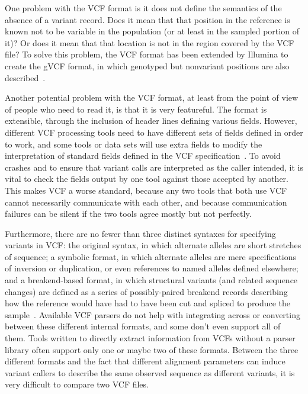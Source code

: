 One problem with the VCF format is it does not define the semantics of the absence of a variant record. Does it mean that that position in the reference is known not to be variable in the population (or at least in the sampled portion of it)? Or does it mean that that location is not in the region covered by the VCF file? To solve this problem, the VCF format has been extended by Illumina to create the gVCF format, in which genotyped but nonvariant positions are also described~\cite{saunders2014about}.

Another potential problem with the VCF format, at least from the point of view of people who need to read it, is that it is very featureful. The format is extensible, through the inclusion of header lines defining various fields. However, different VCF processing tools need to have different sets of fields defined in order to work, and some tools or data sets \cite{sudmant2015integrated} will use extra fields to modify the interpretation of standard fields defined in the VCF specification~\cite{marshall2013variant}. To avoid crashes and to ensure that variant calls are interpreted as the caller intended, it is vital to check the fields output by one tool against those accepted by another. This makes VCF a worse standard, because any two tools that both use VCF cannot necessarily communicate with each other, and because communication failures can be silent if the two tools agree mostly but not perfectly.

Furthermore, there are no fewer than three distinct syntaxes for specifying variants in VCF: the original syntax, in which alternate alleles are short stretches of sequence; a symbolic format, in which alternate alleles are mere specifications of inversion or duplication, or even references to named alleles defined elsewhere; and a breakend-based format, in which structural variants (and related sequence changes) are defined as a series of possibly-paired breakend records describing how the reference would have had to have been cut and spliced to produce the sample~\cite{marshall2013variant}. Available VCF parsers do not help with integrating across or converting between these different internal formats, and some don't even support all of them. Tools written to directly extract information from VCFs without a parser library often support only one or maybe two of these formats. Between the three different formats and the fact that different alignment parameters can induce variant callers to describe the same observed sequence as different variants, it is very difficult to compare two VCF files.

